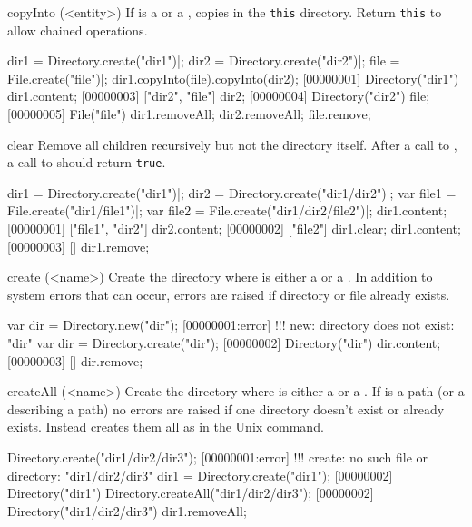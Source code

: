 \begin{urbiscriptapi}
\item[copyInto](<entity>)
  If  is a  or a ,
   copies  in the \lstinline|this| directory.
  Return \lstinline|this| to allow chained operations.
\begin{urbiscript}
dir1 = Directory.create("dir1")|;
dir2 = Directory.create("dir2")|;
file = File.create("file")|;
dir1.copyInto(file).copyInto(dir2);
[00000001] Directory("dir1")
dir1.content;
[00000003] ["dir2", "file"]
dir2;
[00000004] Directory("dir2")
file;
[00000005] File("file")
dir1.removeAll;
dir2.removeAll;
file.remove;
\end{urbiscript}

\item[clear]
  Remove all children recursively but not the directory itself. After a
  call to , a call to  should return
  \lstinline|true|.
\begin{urbiscript}
dir1 = Directory.create("dir1")|;
dir2 = Directory.create("dir1/dir2")|;
var file1 = File.create("dir1/file1")|;
var file2 = File.create("dir1/dir2/file2")|;
dir1.content;
[00000001] ["file1", "dir2"]
dir2.content;
[00000002] ["file2"]
dir1.clear;
dir1.content;
[00000003] []
dir1.remove;
\end{urbiscript}

\item[create](<name>)
  Create the directory  where  is either a
   or a . In addition to system errors that
  can occur, errors are raised if directory or file  already exists.
\begin{urbiscript}
var dir = Directory.new("dir");
[00000001:error] !!! new: directory does not exist: "dir"
var dir = Directory.create("dir");
[00000002] Directory("dir")
dir.content;
[00000003] []
dir.remove;
\end{urbiscript}

\item[createAll](<name>)
  Create the directory  where  is either a
   or a . If  is a
  path (or a  describing a path) no errors are
  raised if one directory doesn't exist or already exists. Instead
   creates them all as in the Unix  command.
\begin{urbiscript}
Directory.create("dir1/dir2/dir3");
[00000001:error] !!! create: no such file or directory: "dir1/dir2/dir3"
dir1 = Directory.create("dir1");
[00000002] Directory("dir1")
Directory.createAll("dir1/dir2/dir3");
[00000002] Directory("dir1/dir2/dir3")
dir1.removeAll;
\end{urbiscript}


\end{urbiscriptapi}
